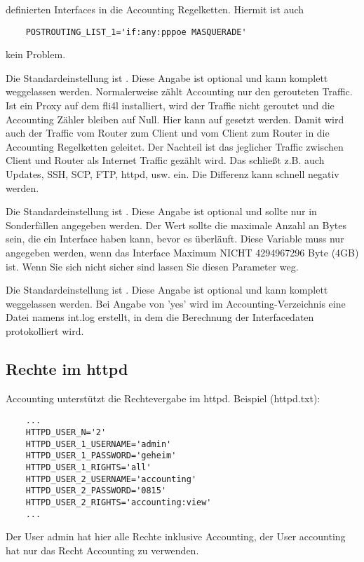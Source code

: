 \begin{description}
definierten Interfaces in die Accounting Regelketten. Hiermit ist auch
\begin{example}
\begin{verbatim}
    POSTROUTING_LIST_1='if:any:pppoe MASQUERADE'
\end{verbatim}
\end{example}
kein Problem.

Die Standardeinstellung ist .
Diese Angabe ist optional und kann komplett weggelassen werden.
Normalerweise zählt Accounting nur den gerouteten Traffic. Ist ein Proxy auf dem
fli4l installiert, wird der Traffic nicht geroutet und die Accounting Zähler bleiben auf
Null. Hier kann  auf  gesetzt werden. Damit wird
auch der Traffic vom Router zum Client und vom Client zum Router in die
Accounting Regelketten geleitet.
Der Nachteil ist das jeglicher Traffic zwischen Client und Router als Internet Traffic
gezählt wird. Das schließt z.B. auch Updates, SSH, SCP, FTP, httpd, usw. ein.
Die Differenz kann schnell negativ werden.

Die Standardeinstellung ist .
Diese Angabe ist optional und sollte nur in Sonderfällen angegeben werden.
Der Wert sollte die maximale Anzahl an Bytes sein, die ein Interface haben kann,
bevor es überläuft. Diese Variable muss nur angegeben werden, wenn das
Interface Maximum NICHT 4294967296 Byte (4GB) ist.
Wenn Sie sich nicht sicher sind lassen Sie diesen Parameter weg.

Die Standardeinstellung ist .
Diese Angabe ist optional und kann komplett weggelassen werden.
Bei Angabe von 'yes' wird im Accounting-Verzeichnis eine Datei namens int.log
erstellt, in dem die Berechnung der Interfacedaten protokolliert wird.

\end{description}

\subsection{Rechte im httpd}
Accounting unterstützt die Rechtevergabe im httpd.
Beispiel (httpd.txt):
\begin{example}
\begin{verbatim}
    ...
    HTTPD_USER_N='2'
    HTTPD_USER_1_USERNAME='admin'
    HTTPD_USER_1_PASSWORD='geheim'
    HTTPD_USER_1_RIGHTS='all'
    HTTPD_USER_2_USERNAME='accounting'
    HTTPD_USER_2_PASSWORD='0815'
    HTTPD_USER_2_RIGHTS='accounting:view'
    ...
\end{verbatim}
\end{example}
Der User admin hat hier alle Rechte inklusive Accounting, der User accounting hat nur
das Recht Accounting zu verwenden.

